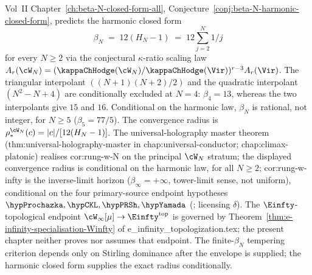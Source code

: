 \begin{remark}%
\label{rem:anchor-wn-closure-beta-exact}%
%
%
Vol~II Chapter~\ref{ch:beta-N-closed-form-all},
Conjecture~\ref{conj:beta-N-harmonic-closed-form}, predicts the
harmonic closed form
\[
 \beta_N \;=\; 12 (H_N - 1) \;=\; 12 \sum_{j=2}^{N} 1/j
\]
for every $N \ge 2$ via the conjectural
$\kappa$-ratio scaling law $A_r(\cW_N) = (\kappaChHodge(\cW_N) /
\kappaChHodge(\Vir))^{r-3} A_r(\Vir)$. The triangular interpolant
$((N+1)(N+2)/2)$ and the quadratic interpolant $(N^2 - N + 4)$ are
conditionally excluded at $N=4$:
$\beta_4 = 13$, whereas the two interpolants give $15$ and $16$.
Conditional on the harmonic law, $\beta_N$ is rational, not integer, for $N \ge 5$
($\beta_5 = 77/5$). The convergence radius is
$\rho_*^{\cW_N}(c) = |c| / [12 (H_N - 1)]$.
The universal-holography master theorem
(\textsf{thm:universal-holography-master} in
\textsf{chap:universal-conductor}; \textsf{chap:climax-platonic})
realises \textsf{cor:rung-w-N} on the principal $\cW_N$ stratum; the
displayed convergence radius is conditional on the harmonic law, for
all $N \ge 2$;
\textsf{cor:rung-w-infty} is the inverse-limit horizon
($\beta_\infty = +\infty$, tower-limit sense, not uniform), conditional
on the four primary-source endpoint hypotheses
$\hypProchazka, \hypCKL, \hypPRSh, \hypYamada$
(\cite{ProchazkaRapcak18,CKL-parafermion,PopeRomansShen-winfty-wedge,
Bakas-Winfty,Yamada}; licensing $\delta$). The $\Einfty$-topological endpoint
$\cW_\infty[\mu]\to\Einfty^{\mathrm{top}}$ is governed by
Theorem~\textup{\ref{thm:e-infinity-specialisation-Winfty}} of
\textsf{e\_infinity\_topologization.tex}; the present chapter
neither proves nor assumes that endpoint. The
finite-$\beta_N$ tempering criterion depends only on Stirling
dominance after the envelope is supplied; the harmonic closed form
supplies the exact radius conditionally.
\end{remark}
